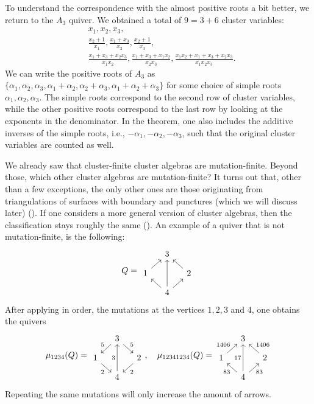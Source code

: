 \documentclass{article}
\begin{document}
To understand the correspondence with the almost positive roots a bit better, we return
to the $A_3$ quiver. We obtained a total of $9 = 3 + 6$ cluster variables:
\begin{align*}
	 & x_1, x_2, x_3,                                                                                               \\
	 & \frac{x_2 + 1}{x_1}, \frac{x_1 + x_3}{x_2}, \frac{x_2 + 1}{x_3},                                             \\
	 & \frac{x_1+x_3+x_2x_3}{x_1x_2}, \frac{x_1+x_3+x_1x_2}{x_2x_3}, \frac{x_1x_2 + x_1 + x_3 + x_2x_3}{x_1x_2x_3}.
\end{align*}
We can write the positive roots of $A_3$ as $\{\alpha_1, \alpha_2, \alpha_3, \alpha_1 + \alpha_2, \alpha_2 + \alpha_3, \alpha_1 + \alpha_2 + \alpha_3\}$ for some choice of simple roots $\alpha_1, \alpha_2, \alpha_3$. The simple roots correspond to the second row of cluster variables, while the other positive roots correspond to the last row by looking at the exponents in the denominator. In the theorem, one also includes the additive inverses of the simple roots, i.e., $-\alpha_1, -\alpha_2, -\alpha_3$, such that the original cluster variables are counted as well.

We already saw that cluster-finite cluster algebras are mutation-finite. Beyond those,
which other cluster algebras are mutation-finite? It turns out that, other than a few
exceptions, the only other ones are those originating from triangulations of surfaces
with boundary and punctures (which we will discuss later)
(\cite{FeliksonShapiroTumarkin2012SkewSCA}). If one considers a more general version of
cluster algebras, then the classification stays roughly the same
(\cite{FeliksonPavel2023cluster}). An example of a quiver that is not mutation-finite,
is the following:
\begin{equation*}
	Q =
	\begin{tikzcd}[sep = small]
		& 3 & \\
		1 \urar &&2 \ular \\
		& 4 \ular \ar[uu] \urar
	\end{tikzcd}
\end{equation*}
%
After applying in order, the mutations at the vertices $1,2,3$ and 4, one obtains the
quivers
\begin{equation*}
	\mu_{1234}(Q) =
	\begin{tikzcd}[sep = small]
		& 3 & \\
		1 \urar[leftarrow, "5"] &&2 \ular[leftarrow, "5"'] \\
		& 4 \ular[leftarrow, "2"] \ar[uu, "3"] \urar[leftarrow, "2"']
	\end{tikzcd}
	,\quad \mu_{12341234}(Q) =
	\begin{tikzcd}[sep = small]
		& 3 & \\
		1 \urar["1406"] &&2 \ular["1406"'] \\
		& 4 \ular["83"] \ar[uu, "17"] \urar["83"']
	\end{tikzcd}
\end{equation*}
%
Repeating the same mutations will only increase the amount of arrows. \medskip
\end{document}
